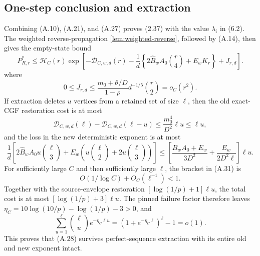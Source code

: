 \subsection{One-step conclusion and extraction}

Combining (A.10), (A.21), and (A.27) proves (2.37) with the value
\(\lambda_i\) in (6.2).  The weighted reverse-propagation
\cref{lem:weighted-reverse}, followed by (A.14), then gives the empty-state bound
\[
 P^*_{R,r}\le\mathcal H_C(r)
 \exp\!\left[-\mathcal D_{C,w,d}(r)
 -\frac1d\left\{2\widehat B_wA_0\binom r4+E_wK_r\right\}
 +J_{r,d}\right]. \tag{A.28}
\]
where
\[
 0\le J_{r,d}\le
 \frac{m_0+\theta/D}{1-\rho}d^{-1/5}\binom r2=o_C(r^2).
 \tag{A.29}
\]
If extraction deletes $u$ vertices from a retained set of size $\ell$,
then the old exact-CGF restoration cost is at most
\[
 \mathcal D_{C,w,d}(\ell)-\mathcal D_{C,w,d}(\ell-u)
 \le\frac{m_0^4}{D^2}\ell u\le\ell u, \tag{A.30}
\]
and the loss in the new deterministic exponent is at most
\[
 \frac1d\left[
 2\widehat B_wA_0u\binom\ell3
 +E_w\left(u\binom\ell2+2u\binom\ell3\right)
 \right]
 \le\left[\frac{\widehat B_wA_0+E_w}{3D^2}
 +\frac{E_w}{2D^2\ell}\right]\ell u.
 \tag{A.31}
\]
For sufficiently large \(C\) and then sufficiently large \(\ell\), the
bracket in (A.31) is
\[
 O(1/\log C)+O_C(\ell^{-1})<1.
\]
Together
with the source-envelope restoration
\([\log(1/p)+1]\ell u\), the total cost is at most
\([\log(1/p)+3]\ell u\).  The pinned failure factor therefore leaves
\(\eta_C=10\log(10/p)-\log(1/p)-3>0\), and
\[
 \sum_{u=1}^{\ell}\binom\ell u e^{-\eta_C\ell u}
 =(1+e^{-\eta_C\ell})^\ell-1=o(1). \tag{A.32}
\]
This proves that (A.28) survives perfect-sequence extraction with its entire
old and new exponent intact.
